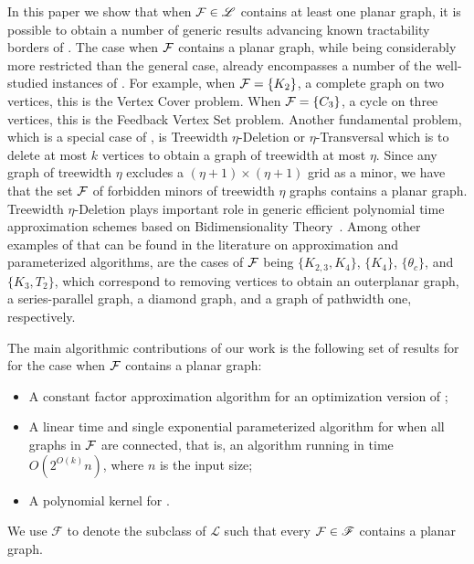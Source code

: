 In this paper we show that when  ${\cal F}\in \mathscr{L}$ contains at least one planar graph, it is possible to obtain 
 a number of generic results advancing known tractability borders of  \fd{}. 
  The case when $\cal F$ contains a planar graph, while being considerably more restricted than the general case, already encompasses a number of the well-studied  
 instances of \fd{}. For  example, when ${\cal F}=\{K_2\}$, a complete graph on two
vertices, this is the {\sc Vertex Cover} problem. When ${\cal F}=\{C_3\}$, a cycle on three
vertices, this is the {\sc Feedback Vertex Set} problem. Another fundamental problem, which is a special case of  \fd{}, is 
 {\sc Treewidth $\eta$-Deletion} or  {\sc
$\eta$-Transversal} which is  to delete
at most $k$ vertices to obtain a graph of treewidth at most $\eta$. Since any graph of treewidth $\eta$ excludes a 
$(\eta+1)\times (\eta+1)$ grid as a minor, we have that the set $\cal F$ of forbidden minors of treewidth 
$\eta$ graphs contains a planar graph. 
{\sc Treewidth $\eta$-Deletion}  plays important role in 
 generic efficient polynomial time approximation schemes based on Bidimensionality
Theory~\cite{FominLRS11,FominLS12}. Among other examples of   \fd{} that can be found in the literature on approximation and parameterized algorithms, are 
the cases of ${\cal F}$ being 
$\{K_{2,3}, K_4\}$, $ \{K_4\}$, $\{\theta_c\}$,  and $ \{K_{3}, T_2\}$, which correspond to removing vertices to
obtain an  outerplanar graph, a series-parallel graph,  a diamond graph,   and a graph  of pathwidth one,  respectively. 


The main algorithmic contributions of our work is the following set of results for \fd{}  for the case  
when  $\cal F$ contains a planar graph:
\begin{itemize}
\setlength{\itemsep}{-2pt}
\item A constant factor approximation algorithm   for an optimization version of \fd{};  
\item A linear time and single exponential parameterized algorithm for \fd{} when all graphs in ${\cal F}$ are connected, that is, an algorithm running in time $O(2^{O(k)} n)$, where $n$ is the input size;
\item A polynomial kernel for \fd.
\end{itemize}
We use $\mathscr{F}$ to denote the subclass of $\mathscr L$ such that every ${\cal F}\in \mathscr{F}$ contains a planar graph. 









